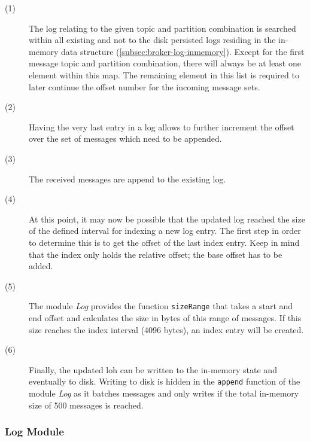 \begin{description}
  \item[(1)]

    The log relating to the given topic and partition combination is 
    searched within all existing and not to the disk persisted logs residing
    in the in-memory data structure (\ref{subsec:broker-log-inmemory}). Except
    for the first message topic and partition combination, there will always be
    at least one element within this map. The remaining element in this list is
    required to later continue the offset number for the incoming
    message sets.

  \item[(2)]

    Having the very last entry in a log allows to further increment the offset
    over the set of messages which need to be appended.
  \item[(3)]

    The received messages are append to the existing log.

  \item[(4)]

    At this point, it may now be possible that the updated log
    reached the size of the defined interval for indexing a new log entry. The
    first step in order to determine this is to get the offset of the last
    index entry. Keep in mind that the index only holds the relative offset;
    the base offset has to be added.

  \item[(5)]

    The module \textit{Log} provides the function \lstinline{sizeRange} that
    takes a start and end offset and calculates the size in bytes of this
    range of messages. If this size reaches the index interval (4096 bytes),
    an index entry will be created.

  \item[(6)]

    Finally, the updated loh can be written to the in-memory state and eventually
    to disk. Writing to disk is hidden in the \lstinline{append} function of the
    module \textit{Log} as it batches messages and only writes if the total in-memory size of 500
    messages is reached.

\end{description}

\subsubsection{Log Module}

